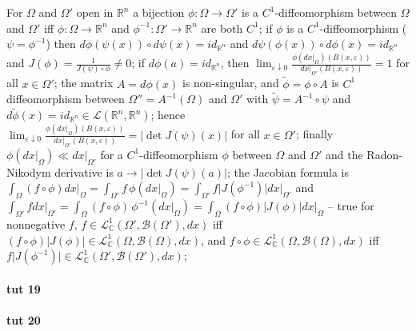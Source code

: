 \documentclass[a4paper]{article}
\newcommand{\Lcal}{\mathcal{L}}
\newcommand{\Bcal}{\mathcal{B}}
\newcommand{\real}{\mathbb{R}}
\newcommand{\cplx}{\mathbb{C}}
\begin{document}
For $\Omega$ and $\Omega'$ open in $\real^n$ a bijection $\phi\colon \Omega \to \Omega'$ is a $C^1$-diffeomorphism between $\Omega$ and $\Omega'$ iff $\phi\colon \Omega \to \real^n$ and $\phi^{-1}\colon \Omega' \to \real^n$ are both $C^1$;
if $\phi$ is a $C^1$-diffeomorphism ($\psi = \phi^{-1}$) then $d\phi(\psi(x)) \circ d\psi(x) = id_{\real^n}$ and $d\psi(\phi(x)) \circ d\phi(x) = id_{\real^n}$ and $J(\phi) = \tfrac1{J(\psi) \circ \phi} \neq 0$;
if $d\phi(a) = id_{\real^n}$, then $\lim_{\varepsilon\downarrow 0} \tfrac{\phi(dx\big\vert_{\Omega})(B(x, \varepsilon))}{dx\big\vert_{\Omega'}(B(x, \varepsilon))} = 1$ for all $x\in \Omega'$;
the matrix $A = d\phi(x)$ is non-singular, and $\tilde{\phi} = \phi \circ A$ is $C^1$ diffeomorphism between $\Omega'' = A^{-1}(\Omega)$ and $\Omega'$ with $\tilde{\psi} = A^{-1} \circ \psi$ and $d\tilde{\phi}(x) = id_{\real^n} \in \Lcal(\real^n, \real^n)$;
hence $\lim_{\varepsilon\downarrow 0} \tfrac{\phi(dx\big\vert_{\Omega})(B(x, \varepsilon))}{dx\big\vert_{\Omega'}(B(x, \varepsilon))} = \lvert \det J(\psi)(x) \rvert$ for all $x\in \Omega'$;
finally $\phi(dx\big\vert_{\Omega}) \ll dx\big\vert_{\Omega'}$ for a $C^1$-diffeomorphism $\phi$ between $\Omega$ and $\Omega'$ and the Radon-Nikodym derivative is $a \to \lvert \det J(\psi)(a) \rvert$;
the Jacobian formula is $\int_\Omega (f\circ \phi) dx\big\vert_{\Omega} = \int_{\Omega'} f \, \phi(dx\big\vert_{\Omega}) = \int_{\Omega'} f \lvert J(\phi^{-1})\rvert dx\big\vert_{\Omega'}$ and $\int_{\Omega'} f dx\big\vert_{\Omega'} = \int_{\Omega} (f\circ \phi) \, \phi^{-1}(dx\big\vert_{\Omega}) = \int_{\Omega} (f\circ \phi) \lvert J(\phi)\rvert dx\big\vert_{\Omega}$ -- true for nonnegative $f$, $f\in \Lcal_\cplx^1(\Omega', \Bcal(\Omega'), dx)$ iff $(f \circ \phi) \lvert J(\phi) \rvert \in \Lcal_\cplx^1(\Omega, \Bcal(\Omega), dx)$, and $f \circ \phi \in \Lcal_\cplx^1(\Omega, \Bcal(\Omega), dx)$ iff $f \lvert J(\phi^{-1}) \rvert \in \Lcal_\cplx^1(\Omega', \Bcal(\Omega'), dx)$;



\paragraph{tut 19} %
\label{par:tut_19}





\paragraph{tut 20} %
\label{par:tut_20}



\end{document}
